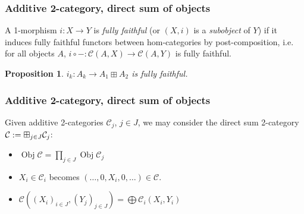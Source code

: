 \documentclass{beamer}
\DeclareMathOperator{\Obj}{Obj}
\newtheorem{proposition}[theorem]{Proposition}
\newcommand{\cC}{{\mathcal{C}}}
\newcommand{\bigboxplus}{\Huge \boxplus}
\begin{document}
\begin{frame}
\frametitle{Additive 2-category, direct sum of objects}

%

\begin{definition}[subobject]
A 1-morphism $i: X \to Y$ is \emph{fully faithful}
(or $(X,i)$ is a \emph{subobject} of $Y$)
if it induces fully faithful functors between hom-categories
by post-composition, i.e. for all objects $A$,
$i \circ - : \cC(A,X) \to \cC(A,Y)$
is fully faithful.
\end{definition}

\pause

\begin{proposition}
$i_k: A_k \to A_1 \boxplus A_2$ is fully faithful.
\end{proposition}


\end{frame}
\begin{frame}
\frametitle{Additive 2-category, direct sum of objects}

\begin{definition}
Given additive 2-categories $\cC_j$, $j \in J$,
we may consider the direct sum 2-category
$\cC := \bigboxplus_{j \in J} \cC_j$:
\begin{itemize}
\item $\Obj \cC = \prod_{j \in J} \Obj \cC_j$

\pause

\item $X_i \in \cC_i$ becomes
$(\ldots,0,X_i,0,\ldots) \in \cC$.

\pause

%

\item %
	$\cC((X_i)_{i\in J}, (Y_j)_{j \in J})
	= \bigoplus \cC_i(X_i, Y_i)$
\end{itemize}
\end{definition}

\end{frame}
\end{document}
